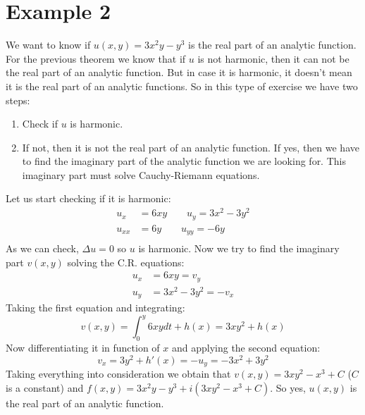 \documentclass{report}
\begin{document}
    \section*{Example 2}
    We want to know if $u(x,y) = 3x^2y-y^3$ is the real part of an analytic function.\\
    For the previous theorem we know that if $u$ is not harmonic, then it can not be the real part of an analytic function. But in case it is harmonic, it doesn't mean it is the real part of an analytic functions. So in this type of exercise we have two steps:
    \begin{enumerate}
        \item Check if $u$ is harmonic.
        \item If not, then it is not the real part of an analytic function. If yes, then we have to find the imaginary part of the analytic function we are looking for. This imaginary part must solve Cauchy-Riemann equations.
    \end{enumerate}
    Let us start checking if it is harmonic:
    \begin{align*}
        u_x &= 6xy \quad \quad u_y = 3x^2-3y^2 \\
        u_{xx} &= 6y \quad \quad u_{yy} = -6y \\
    \end{align*}
    As we can check, $\Delta u = 0 $ so  $u$ is harmonic. Now we try to find the imaginary part $v(x,y)$ solving the C.R. equations:
    \begin{align*}
        u_x &= 6xy = v_y \\
        u_y &= 3x^2-3y^2 = -v_x
    \end{align*}
    Taking the first equation and integrating:\\
    \begin{equation*}
        v(x,y)=\int_{0}^y6xydt+h(x)=3xy^2+h(x)
    \end{equation*}
    Now differentiating it in function of $x$ and applying the second equation:\\
    \begin{equation*}
        v_x= 3y^2 + h'(x) = -u_y = -3x^2+3y^2
    \end{equation*}
    Taking everything into consideration we obtain that $v(x,y) = 3xy^2 - x^3 + C$ ($C$ is a constant) and $f(x,y)= 3x^2y-y^3+i(3xy^2 - x^3 + C)$. So yes, $u(x,y)$ is the real part of an analytic function.
\end{document}
